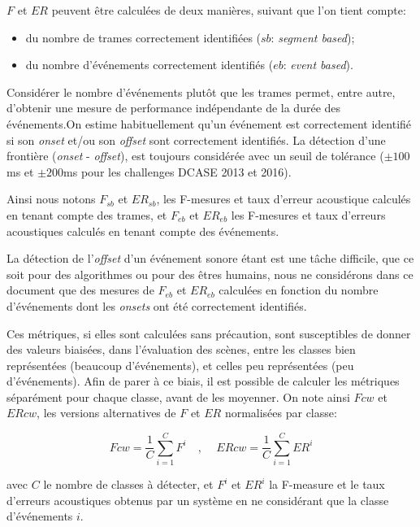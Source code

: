 $F$ et $ER$ peuvent être calculées de deux manières, suivant que l'on tient compte: 

\begin{itemize}
\item du nombre de trames correctement identifiées ($sb$: \emph{segment based});
\item du nombre d'événements correctement identifiés ($eb$: \emph{event based}).
\end{itemize}

Considérer le nombre d'événements plutôt que les trames permet, entre autre, d'obtenir une mesure de performance indépendante de la durée des événements.On estime habituellement qu'un événement est correctement identifié si son \emph{onset} et/ou son \emph{offset} sont correctement identifiés. La détection d'une frontière (\emph{onset} - \emph{offset}), est toujours considérée avec un seuil de tolérance ($\pm100$ms et $\pm200$ms pour les challenges DCASE 2013 et 2016).

Ainsi nous notons $F_{sb}$ et $ER_{sb}$, les F-mesures et taux d'erreur acoustique calculés en tenant compte des trames, et $F_{eb}$ et $ER_{eb}$ les F-mesures et taux d'erreurs acoustiques calculés en tenant compte des événements.

La détection de l'\emph{offset} d'un événement sonore étant est une tâche difficile, que ce soit pour des algorithmes ou pour des êtres humains, nous ne considérons dans ce document que des mesures de $F_{eb}$ et $ER_{eb}$ calculées en fonction du nombre d'événements dont les \emph{onsets} ont été correctement identifiés.

Ces métriques, si elles sont calculées sans précaution, sont susceptibles de donner des valeurs biaisées, dans l'évaluation des scènes, entre les classes bien représentées (beaucoup d'événements), et celles peu représentées (peu d'événements). Afin de parer à ce biais, il est possible de calculer les métriques séparément pour chaque classe, avant de les moyenner. On note ainsi $Fcw$ et $ERcw$, les versions alternatives de $F$ et $ER$ normalisées par classe:

\begin{equation}
\label{eq:ch7_eq3}
Fcw=\dfrac{1}{C}\sum_{i=1}^C F^i \quad \textrm{, } \quad ERcw=\dfrac{1}{C}\sum_{i=1}^C ER^i
\end{equation}

avec $C$ le nombre de classes à détecter, et $F^i$ et $ER^i$ la F-measure et le taux d'erreurs acoustiques obtenus par un système en ne considérant que la classe d'événements $i$. 

